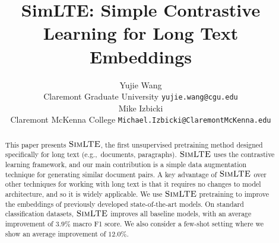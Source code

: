 \documentclass[11pt]{article}
\title{SimLTE: Simple Contrastive Learning for Long Text Embeddings}
\author{Yujie Wang \\
  Claremont Graduate University 
  \texttt{yujie.wang@cgu.edu} \\\And
  Mike Izbicki \\
  Claremont McKenna College
  \texttt{Michael.Izbicki@ClaremontMcKenna.edu} \\}
\newcommand{\our}{\mbox{\textsc{SimLTE}}}
\begin{document}
\maketitle
\begin{abstract}

This paper presents $\our$, the first unsupervised pretraining
method designed specifically for long text (e.g.,~documents, paragraphs).
$\our$ uses the contrastive learning framework, and our main contribution is a simple data augmentation technique for generating similar document pairs.
A key advantage of $\our$ over other techniques for working with
long text is that it requires no changes to model architecture, and so it is widely applicable.
We use $\our$ pretraining to improve the embeddings of previously
developed state-of-the-art models.
On standard classification datasets, $\our$ improves all baseline
models, with an average improvement of $3.9\%$ macro F1 score.
We also consider a few-shot setting where we show an average
improvement of $12.0\%$.


\end{abstract}
\end{document}
